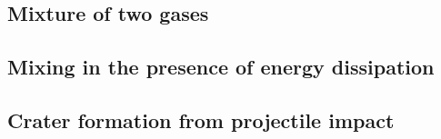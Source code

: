 

\subsection{Mixture of two gases}\label{sec:mix1}



\subsection{Mixing in the presence of energy dissipation}\label{sec:mix2}



\subsection{Crater formation from projectile impact}\label{sec:crater}





